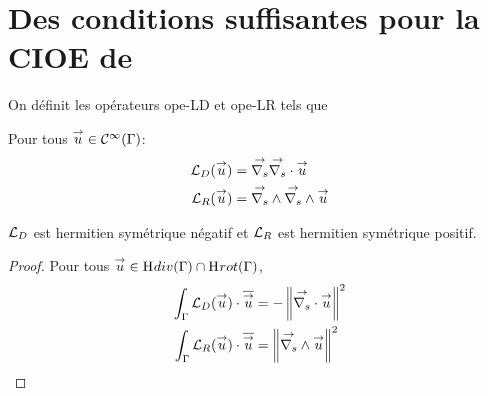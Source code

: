 \section[Des CSU pour la CIOE de Marceaux 2000]{Des conditions suffisantes pour la CIOE de \cite{marceaux_high-order_2000}}

  \begin{defn}
    On définit les opérateurs \gls{ope-LD} et \gls{ope-LR} tels que %

    Pour tous \(\vu \in \mathcal{C}^\infty(\Gamma)\): 
    \begin{align*}
      \LD(\vu) &= \vgrads \vdivs \vu
      \\
      \LR(\vu) &= \vrots \vrots \vu
    \end{align*}
  \end{defn}

  \begin{prop}
    \(\LD\) est hermitien symétrique négatif et \(\LR\) est hermitien symétrique positif.
  \end{prop}

  \begin{proof}
    Pour tous \(\vu \in \Sobolev[div](\Gamma)\cap\Sobolev[rot]{(\Gamma)}\),
    \begin{align*}
      \int_\Gamma \LD(\vu)\cdot \conj{\vu} &= -\norm{\vdivs \vu}^2
      \\
      \int_\Gamma \LR(\vu)\cdot \conj{\vu} &=\norm{ \vrots \vu}^2
    \end{align*}
  \end{proof}

